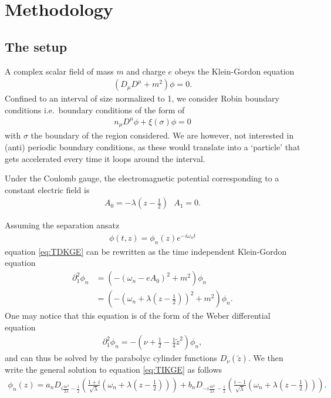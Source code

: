 \chapter{Methodology}

\section{The setup}

A complex scalar field of mass $m$ and charge $e$ obeys the Klein-Gordon equation
\begin{align}
	\left( D_\mu D^\mu + m^2 \right)\phi = 0.
	\label{eq:TDKGE}
\end{align}
Confined to an interval of size normalized to 1, we consider Robin boundary conditions i.e.~boundary conditions of the form of 
\begin{align}
	n_\mu D^{\mu} \phi+ \xi(\sigma)	 \phi = 0
\end{align}
with $\sigma$ the boundary of the region considered.
We are however, not interested in (anti) periodic boundary conditions, as these would translate into a `particle' that gets accelerated every time it loops around the interval.

Under the Coulomb gauge, the electromagnetic potential corresponding to a constant electric field is
\begin{align}
	A_0 = -\lambda \left(z - \frac{1}{2}\right) \,\,\,\, A_1 = 0.
\end{align}

Assuming the separation ansatz 
\begin{align}
	\phi(t, z) = \phi_n(z) e^{-i\omega_n t}
\end{align}
equation \eqref{eq:TDKGE} can be rewritten as the time independent Klein-Gordon equation
\begin{align}
	\partial_1^2 \phi_n &=
	\left( - (\omega_n - e A_0)^2 + m^2 \right) \phi_n\\
			    \label{eq:TIKGE}
			    &=\left( - \left(\omega_n + \lambda \left( z - \frac{1}{2} \right) \right)^2 + m^2 \right) \phi_n.
\end{align}
One may notice that this equation is of the form of the Weber differential equation
\begin{align}
	\partial_1^2 \phi_n = - \left( \nu + \frac{1}{2}-\frac{1}{4}\tilde{z}^2 \right) \phi_n,
\end{align}
and can thus be solved by the parabolyc cylinder functions $D_\nu\left( \tilde{z} \right) $. 
We then write the general solution to equation \ref{eq:TIKGE} as follows
\begin{align}
	\phi_n(z) = 
	a_n D_{i \frac{m^2}{2\lambda} - \frac{1}{2}} \left( 
		\frac{1+i}{\sqrt{\lambda} }
		\left( \omega_n + \lambda \left( z-\frac{1}{2} \right)
		\right) 
	\right) 
	+
	b_n D_{-i \frac{m^2}{2\lambda} - \frac{1}{2}} \left( 
		\frac{i - 1}{\sqrt{\lambda} }
		\left( \omega_n + \lambda \left( z-\frac{1}{2} \right)
		\right) 
	\right). 
\end{align}


